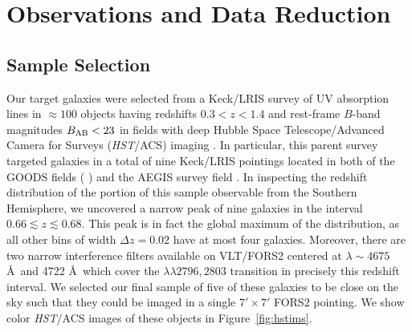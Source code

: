 \documentclass[trackchanges,twocolumn]{aastex62}
\begin{document}
\section{Observations and Data Reduction}\label{sec:obs_red}
\subsection{Sample Selection}
Our target galaxies were selected from a Keck/LRIS survey of UV absorption lines in $\approx 100$ objects having redshifts $0.3< z < 1.4$ and rest-frame $B$-band magnitudes $B_{\rm AB}< 23$ in fields with deep Hubble Space Telescope/Advanced Camera for Surveys (\emph{HST}/ACS) imaging \citep{Rubin_2014}.  In particular, this parent survey targeted galaxies in a total of nine Keck/LRIS pointings located in both of the GOODS fields (\citeauthor{Giavalisco2004} \citeyear{Giavalisco2004}) and the AEGIS survey field \citep[the Extended Groth Strip;][]{Davis2007}.  In inspecting the redshift distribution of the portion of this sample observable from the Southern Hemisphere, we uncovered a narrow peak of nine galaxies in the interval $0.66 \lesssim z \lesssim 0.68$.  This peak is in fact the global maximum of the distribution, as all other bins of width $\Delta z = 0.02$ have at most four galaxies.  Moreover, there are two narrow interference filters available on VLT/FORS2 centered at $\lambda \sim 4675$ \AA\ and 4722 \AA\ which cover the  $\lambda \lambda 2796, 2803$ transition in precisely this redshift interval.  We selected our final sample of five of these galaxies %
to be close on the sky such that they could be imaged in a single $7' \times 7' $ FORS2 pointing.  
We show color {\it HST}/ACS images of these objects in Figure~\ref{fig:hstims}.
\end{document}
